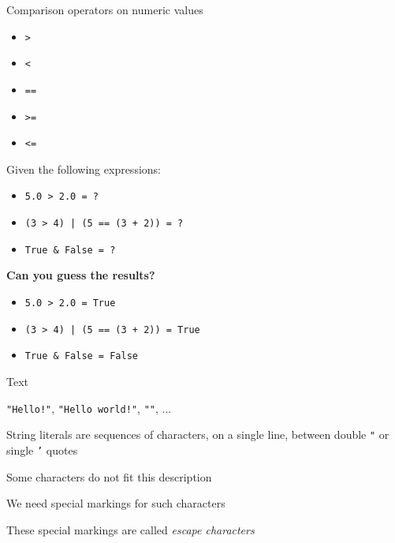 \documentclass{beamer}
\begin{document}
\begin{slide}{
\item Comparison operators on numeric values
\begin{itemize}
\item \texttt{>}
\item \texttt{<}
\item \texttt{==}
\item \texttt{>=}
\item \texttt{<=}
\end{itemize}
}\end{slide}

\begin{slide}{
\item Given the following expressions:
\begin{itemize}
\item \texttt{5.0 > 2.0 = ?}
\item \texttt{(3 > 4) | (5 == (3 + 2)) = ?}
\item \texttt{True \& False = ?}
\end{itemize}
\item \textbf{Can you guess the results?}
\pause
\begin{itemize}
\item \texttt{5.0 > 2.0 = True}
\item \texttt{(3 > 4) | (5 == (3 + 2)) = True}
\item \texttt{True \& False = False}
\end{itemize}
}\end{slide}

\begin{slide}{
\item Text
\item \texttt{"Hello!"}, \texttt{"Hello world!"}, \texttt{""}, ...
}\end{slide}

\begin{slide}{
\item String literals are sequences of characters, on a single line, between double \texttt{"} or single \texttt{'} quotes 
\item Some characters do not fit this description
\item We need special markings for such characters
\item These special markings are called \textit{escape characters}
}\end{slide}
\end{document}
